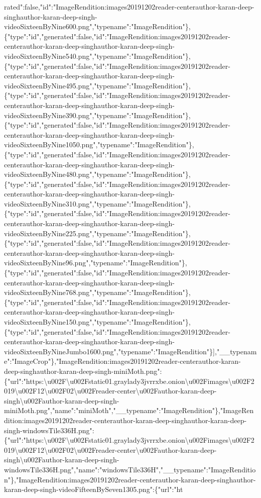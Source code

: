 rated":false,"id":"ImageRendition:images20191202reader-centerauthor-karan-deep-singhauthor-karan-deep-singh-videoSixteenByNine600.png","typename":"ImageRendition"\},\{"type":"id","generated":false,"id":"ImageRendition:images20191202reader-centerauthor-karan-deep-singhauthor-karan-deep-singh-videoSixteenByNine540.png","typename":"ImageRendition"\},\{"type":"id","generated":false,"id":"ImageRendition:images20191202reader-centerauthor-karan-deep-singhauthor-karan-deep-singh-videoSixteenByNine495.png","typename":"ImageRendition"\},\{"type":"id","generated":false,"id":"ImageRendition:images20191202reader-centerauthor-karan-deep-singhauthor-karan-deep-singh-videoSixteenByNine390.png","typename":"ImageRendition"\},\{"type":"id","generated":false,"id":"ImageRendition:images20191202reader-centerauthor-karan-deep-singhauthor-karan-deep-singh-videoSixteenByNine1050.png","typename":"ImageRendition"\},\{"type":"id","generated":false,"id":"ImageRendition:images20191202reader-centerauthor-karan-deep-singhauthor-karan-deep-singh-videoSixteenByNine480.png","typename":"ImageRendition"\},\{"type":"id","generated":false,"id":"ImageRendition:images20191202reader-centerauthor-karan-deep-singhauthor-karan-deep-singh-videoSixteenByNine310.png","typename":"ImageRendition"\},\{"type":"id","generated":false,"id":"ImageRendition:images20191202reader-centerauthor-karan-deep-singhauthor-karan-deep-singh-videoSixteenByNine225.png","typename":"ImageRendition"\},\{"type":"id","generated":false,"id":"ImageRendition:images20191202reader-centerauthor-karan-deep-singhauthor-karan-deep-singh-videoSixteenByNine96.png","typename":"ImageRendition"\},\{"type":"id","generated":false,"id":"ImageRendition:images20191202reader-centerauthor-karan-deep-singhauthor-karan-deep-singh-videoSixteenByNine768.png","typename":"ImageRendition"\},\{"type":"id","generated":false,"id":"ImageRendition:images20191202reader-centerauthor-karan-deep-singhauthor-karan-deep-singh-videoSixteenByNine150.png","typename":"ImageRendition"\},\{"type":"id","generated":false,"id":"ImageRendition:images20191202reader-centerauthor-karan-deep-singhauthor-karan-deep-singh-videoSixteenByNineJumbo1600.png","typename":"ImageRendition"\}{]},"\_\_typename":"ImageCrop"\},"ImageRendition:images20191202reader-centerauthor-karan-deep-singhauthor-karan-deep-singh-miniMoth.png":\{"url":"https:\textbackslash{}u002F\textbackslash{}u002Fstatic01.graylady3jvrrxbe.onion\textbackslash{}u002Fimages\textbackslash{}u002F2019\textbackslash{}u002F12\textbackslash{}u002F02\textbackslash{}u002Freader-center\textbackslash{}u002Fauthor-karan-deep-singh\textbackslash{}u002Fauthor-karan-deep-singh-miniMoth.png","name":"miniMoth","\_\_typename":"ImageRendition"\},"ImageRendition:images20191202reader-centerauthor-karan-deep-singhauthor-karan-deep-singh-windowsTile336H.png":\{"url":"https:\textbackslash{}u002F\textbackslash{}u002Fstatic01.graylady3jvrrxbe.onion\textbackslash{}u002Fimages\textbackslash{}u002F2019\textbackslash{}u002F12\textbackslash{}u002F02\textbackslash{}u002Freader-center\textbackslash{}u002Fauthor-karan-deep-singh\textbackslash{}u002Fauthor-karan-deep-singh-windowsTile336H.png","name":"windowsTile336H","\_\_typename":"ImageRendition"\},"ImageRendition:images20191202reader-centerauthor-karan-deep-singhauthor-karan-deep-singh-videoFifteenBySeven1305.png":\{"url":"ht